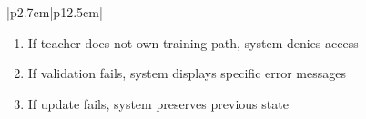 \begin{table}[H]
\begin{tabular}{|p{2.7cm}|p{12.5cm}|}
\begin{minipage}[t]{\linewidth}
\begin{enumerate}[topsep=0pt,itemsep=1pt,parsep=0pt,partopsep=0pt]
                                          \item If teacher does not own training path, system denies access
                                          \item If validation fails, system displays specific error messages
                                          \item If update fails, system preserves previous state
                                      \end{enumerate}
                                  \end{minipage} \\
        \hline
    \end{tabular}
    \label{tab:teacher-edit-tp}
\end{table}

